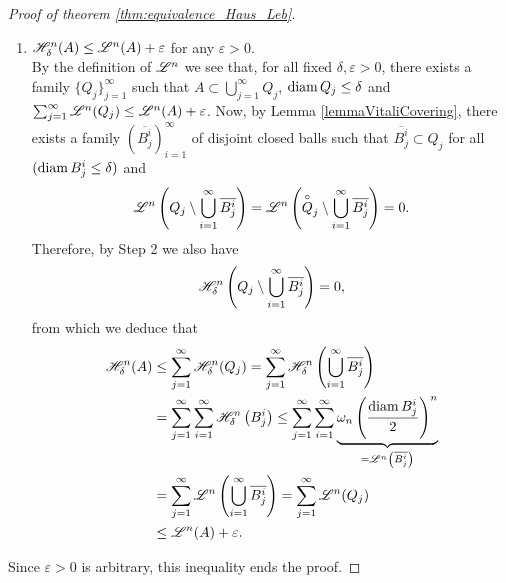 \begin{proof}[Proof of theorem \ref{thm:equivalence_Haus_Leb}]
\begin{enumerate}
\item $\mathscr{H}^{n}_\delta(A) \leq \mathscr{L}^{n}(A) + \varepsilon$ for any $\varepsilon >
0$.
\\
By the definition of $\mathscr{L}^{n}$ we see that, for all fixed $\delta, \varepsilon > 0$, 
there exists a family $\{Q_j\}_{j=1}^\infty$ such that $A \subset
\bigcup_{j=1}^\infty Q_j$, $\operatorname{diam} Q_j \leq \delta$ 
and $\sum_{j=1}^\infty \mathscr{L}^{n}(Q_j) \leq \mathscr{L}^{n}(A) + \varepsilon$.
Now, by Lemma \ref{lemmaVitaliCovering}, there exists a family
$(\overline{B_j^i})_{i=1}^\infty$ of disjoint
closed balls such that $\overline{B_j^i} \subset Q_j$ for all $(\operatorname{diam} B^i_j \leq
\delta)$ and 
\vspace{-0.4em}
\[
\mathscr{L}^{n}\left(Q_j \setminus \bigcup_{i=1}^\infty
\overline{B_j^i}\right) = \mathscr{L}^{n}\left(\overset{\circ}{Q}_j \setminus \bigcup_{i=1}^\infty
\overline{B_j^i}\right) 
= 0.
\]
Therefore, by Step 2 we also have
\vspace{-0.4em}
\[
\mathscr{H}^{n}_\delta\left(Q_j \setminus \bigcup_{i=1}^\infty
\overline{B_j^i}\right) = 0,
\]
from which we deduce that
\[
\begin{aligned}
\Haus{n}_\delta(A) 
&\leq \sum_{j=1}^\infty \Haus{n}_\delta(Q_j) 
= \sum_{j=1}^\infty \Haus{n}_\delta \left(\bigcup_{i=1}^\infty
\overline{B_j^i}\right)
\\&= \sum_{j=1}^\infty  \sum_{i=1}^\infty
\Haus{n}_\delta \left( B_j^i\right)
\leq \sum_{j=1}^\infty  \sum_{i=1}^\infty
\underbrace{
\omega_n\left(\frac{\diam
B^i_j}{2}\right)^n}%
_{=\Leb{n}\left(\overline{B^i_j}\right)}
\\&= 
\sum_{j=1}^\infty  
\Leb{n}\left(\bigcup_{i=1}^\infty\overline{B^i_j}\right)
= 
\sum_{j=1}^\infty  
\Leb{n}(Q_j)
\\ &\leq \Leb{n}(A) + \varepsilon.
\end{aligned}
\]
\end{enumerate}
Since $\varepsilon > 0$ is arbitrary, this inequality ends the proof.
\end{proof}

